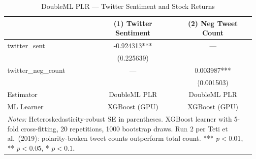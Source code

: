 \begin{table}[htbp]
\centering
\caption{DoubleML PLR --- Twitter Sentiment and Stock Returns\label{tab:dml_twitter}}
\begin{tabular}{lcc}
\hline\hline
 & (1) Twitter Sentiment & (2) Neg Tweet Count \\
\hline
twitter\_sent & -0.924313*** & --- \\
& (0.225639) &  \\
twitter\_neg\_count & --- & 0.003987*** \\
&  & (0.001503) \\
\hline
Estimator & DoubleML PLR & DoubleML PLR \\
ML Learner & XGBoost (GPU) & XGBoost (GPU) \\
\hline\hline
\multicolumn{3}{p{0.95\linewidth}}{\footnotesize \textit{Notes:} Heteroskedasticity-robust SE in parentheses. XGBoost learner with 5-fold cross-fitting, 20 repetitions, 1000 bootstrap draws. Run 2 per Teti et al.\ (2019): polarity-broken tweet counts outperform total count. *** $p<0.01$, ** $p<0.05$, * $p<0.1$.} \\
\end{tabular}
\end{table}